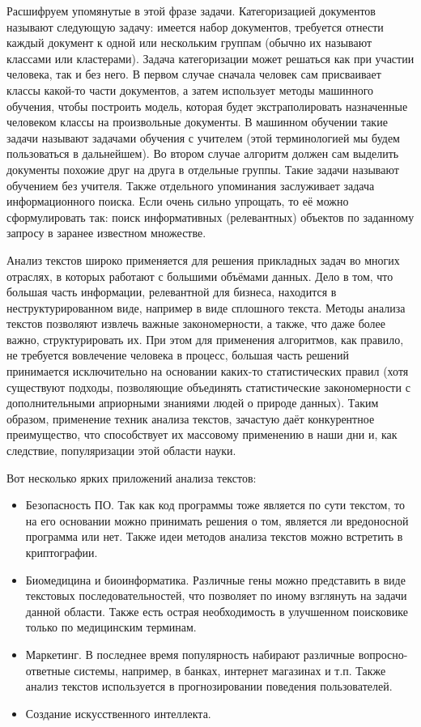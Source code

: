 \documentclass[a4paper,14pt]{extarticle}
\begin{document}
Расшифруем упомянутые в этой фразе задачи. Категоризацией документов называют следующую задачу: имеется набор документов, требуется отнести каждый документ к одной или нескольким группам (обычно их называют классами или кластерами). Задача категоризации может решаться как при участии человека, так и без него. В первом случае сначала человек сам присваивает классы какой-то части документов, а затем использует методы машинного обучения, чтобы построить модель, которая будет экстраполировать назначенные человеком классы на произвольные документы. В машинном обучении такие задачи называют задачами обучения с учителем (этой терминологией мы будем пользоваться в дальнейшем). Во втором случае алгоритм должен сам выделить документы похожие друг на друга в отдельные группы. Такие задачи называют обучением без учителя. Также отдельного упоминания заслуживает задача информационного поиска. Если очень сильно упрощать, то её можно сформулировать так: поиск информативных (релевантных) объектов по заданному запросу в заранее известном множестве.

Анализ текстов широко применяется для решения прикладных задач во многих отраслях, в которых работают с большими объёмами данных. Дело в том, что большая часть информации, релевантной для бизнеса, находится в неструктурированном виде, например в виде сплошного текста. Методы анализа текстов позволяют извлечь важные закономерности, а также, что даже более важно, структурировать их. При этом для применения алгоритмов, как правило, не требуется вовлечение человека в процесс, большая часть решений принимается исключительно на основании каких-то статистических правил (хотя существуют подходы, позволяющие объединять статистические закономерности с дополнительными априорными знаниями людей о природе данных). Таким образом, применение техник анализа текстов, зачастую даёт конкурентное преимущество, что способствует их массовому применению в наши дни и, как следствие, популяризации этой области науки.

Вот несколько ярких приложений анализа текстов:
\begin{itemize}
\item Безопасность ПО. Так как код программы тоже является по сути текстом, то на его основании можно принимать решения о том, является ли вредоносной программа или нет. Также идеи методов анализа текстов можно встретить в криптографии.
\item Биомедицина и биоинформатика. Различные гены можно представить в виде текстовых последовательностей, что позволяет по иному взглянуть на задачи данной области. Также есть острая необходимость в улучшенном поисковике только по медицинским терминам.
\item Маркетинг. В последнее время популярность набирают различные вопросно-ответные системы, например, в банках, интернет магазинах и т.п. Также анализ текстов используется в прогнозировании поведения пользователей.
\item Создание искусственного интеллекта.
\end{itemize}
\end{document}
